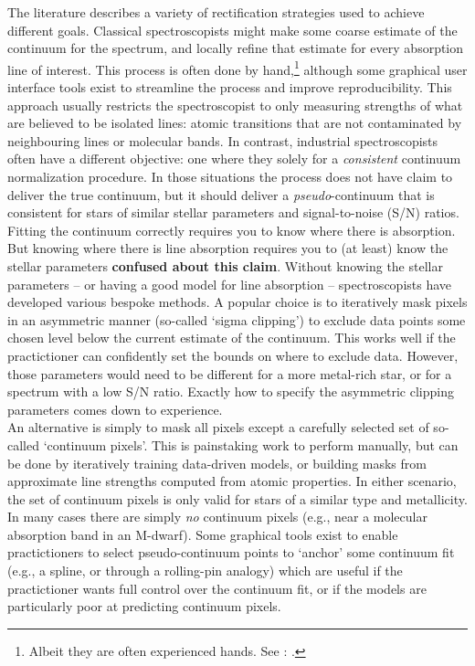 \documentclass[modern]{aastex631}
\newcommand{\ajw}[1]{\textbf{#1}}
\begin{document}
The literature describes a variety of rectification strategies used to achieve different goals. Classical spectroscopists might make some coarse estimate of the continuum for the spectrum, and locally refine that estimate for every absorption line of interest. This process is often done by hand,\footnote{Albeit they are often experienced hands. See \citet{Bensby:2014}: .} although some graphical user interface tools exist to streamline the process and improve reproducibility. This approach usually restricts the spectroscopist to only measuring strengths of what are believed to be isolated lines: atomic transitions that are not contaminated by neighbouring lines or molecular bands. In contrast, industrial spectroscopists often have a different objective: one where they solely for a \emph{consistent} continuum normalization procedure. In those situations the process does not have claim to deliver the true continuum, but it should deliver a \emph{pseudo}-continuum that is consistent for stars of similar stellar parameters and signal-to-noise (S/N) ratios.\\

Fitting the continuum correctly requires you to know where there is absorption. But knowing where there is line absorption requires you to (at least) know the stellar parameters \ajw{confused about this claim}. Without knowing the stellar parameters -- or having a good model for line absorption -- spectroscopists have developed various bespoke methods. A popular choice is to iteratively mask pixels in an asymmetric manner (so-called `sigma clipping') to exclude data points some chosen level below the current estimate of the continuum. This works well if the practictioner can confidently set the bounds on where to exclude data. However, those parameters would need to be different for a more metal-rich star, or for a spectrum with a low S/N ratio. Exactly how to specify the asymmetric clipping parameters comes down to experience.\\

An alternative is simply to mask all pixels except a carefully selected set of so-called `continuum pixels'. This is painstaking work to perform manually, but can be done by iteratively training data-driven models, or building masks from approximate line strengths computed from atomic properties. In either scenario, the set of continuum pixels is only valid for stars of a similar type and metallicity. In many cases there are simply \emph{no} continuum pixels (e.g., near a molecular absorption band in an M-dwarf). Some graphical tools exist to enable practictioners to select pseudo-continuum points to `anchor' some continuum fit (e.g., a spline, or through a rolling-pin analogy) which are useful if the practictioner wants full control over the continuum fit, or if the models are particularly poor at predicting continuum pixels.\\
\end{document}
